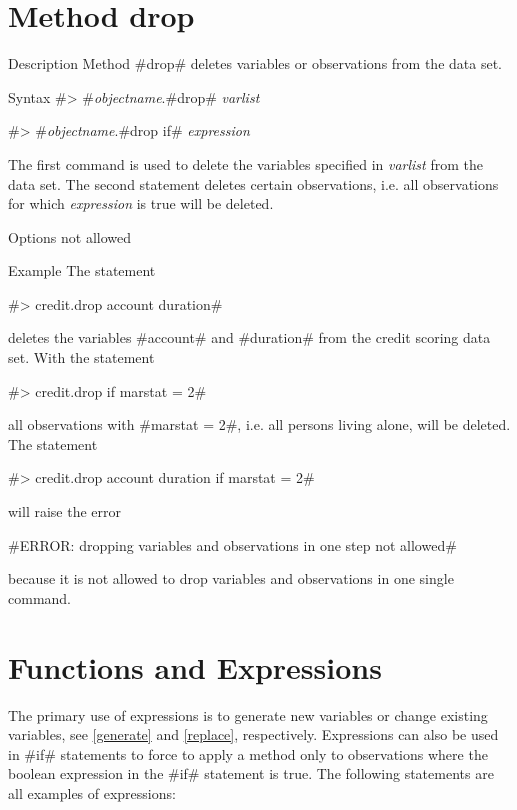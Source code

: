 \section{Method drop}
 \label{drop} 

\begin{stanza}{Description}
Method #drop# deletes variables or observations from the data set.
\end{stanza}

\begin{stanza}{Syntax}
#> #{\em objectname}.#drop# {\em varlist}

#> #{\em objectname}.#drop if# {\em expression}

The first command is used to delete the variables specified in {\em varlist} from the data set. The second statement deletes certain observations, i.e. all observations for which {\em expression} is true will be deleted.
\end{stanza}

\begin{stanza}{Options}
not allowed
\end{stanza}

\begin{stanza}{Example}
The statement

#> credit.drop account duration#

deletes the variables #account# and #duration# from the credit scoring data set. With the statement

#> credit.drop if marstat = 2#

all observations with #marstat = 2#, i.e. all persons living alone, will be deleted. The statement

#> credit.drop account duration if marstat = 2#

will raise the error

#ERROR: dropping variables and observations in one step not allowed#

because it is not allowed to drop variables and observations in one single command.
\end{stanza}


\section{Functions and Expressions}
 \label{expression} 

The primary use of expressions is to generate new variables or change existing variables, see \autoref{generate} and \autoref{replace}, respectively. Expressions can also be used in #if# statements to force \BayesX to apply a method only to
observations where the boolean expression in the #if# statement is true. The following statements are all examples of expressions:

